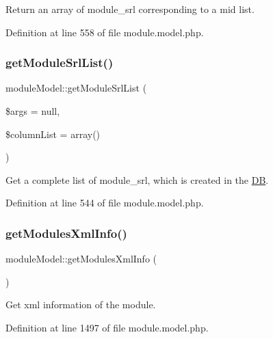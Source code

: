 Return an array of module\+\_\+srl corresponding to a mid list. 



Definition at line 558 of file module.\+model.\+php.

\mbox{\label{classmoduleModel_ae63e7e551002fac4c01a330a76dd7244}} 
\subsubsection{\texorpdfstring{get\+Module\+Srl\+List()}{getModuleSrlList()}}
{\footnotesize\ttfamily module\+Model\+::get\+Module\+Srl\+List (\begin{DoxyParamCaption}\item[{}]{\$args = {\ttfamily null},  }\item[{}]{\$column\+List = {\ttfamily array()} }\end{DoxyParamCaption})}



Get a complete list of module\+\_\+srl, which is created in the \hyperlink{classDB}{DB}. 



Definition at line 544 of file module.\+model.\+php.

\mbox{\label{classmoduleModel_ab0740093a121db65a8d65777fdcd8f00}} 
\subsubsection{\texorpdfstring{get\+Modules\+Xml\+Info()}{getModulesXmlInfo()}}
{\footnotesize\ttfamily module\+Model\+::get\+Modules\+Xml\+Info (\begin{DoxyParamCaption}{ }\end{DoxyParamCaption})}



Get xml information of the module. 



Definition at line 1497 of file module.\+model.\+php.

\mbox{\label{classmoduleModel_a6baa2faf83fc96fba51072276c9cb7c3}} 
